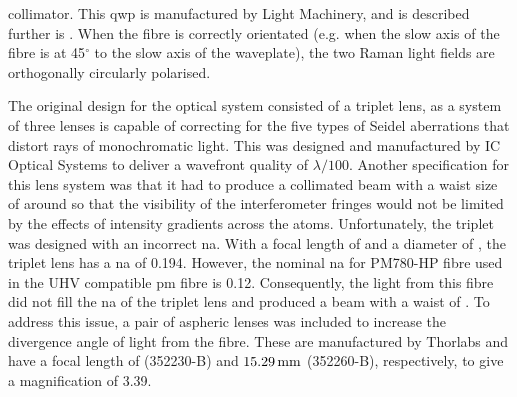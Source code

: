 collimator. This \ac{qwp} is manufactured by Light Machinery, and is described
further is . When the fibre is correctly
orientated (e.g. when the slow axis of the fibre is at 45$^\circ$ to the slow
axis of the waveplate), the two Raman light fields are orthogonally circularly
polarised. \par\noindent The original design for the optical system consisted of
a triplet lens, as a system of three lenses is capable of correcting for the
five types of Seidel aberrations that distort rays of monochromatic light. This
was designed and manufactured by IC Optical Systems to deliver a
wavefront quality of $\lambda/100$. Another specification for
this lens system was that it had to produce a collimated beam with a waist size
of around  so that the visibility of the
interferometer fringes would not be limited by the effects of intensity gradients across the
atoms. Unfortunately, the triplet was designed with an incorrect \ac{na}. With a
focal length of  and a diameter of
, the triplet lens has a \ac{na} of 0.194. However,
the nominal \ac{na} for PM780-HP fibre used in the UHV compatible \ac{pm} fibre
is 0.12. Consequently, the light from this fibre did not fill the \ac{na} of the
triplet lens and produced a beam with a waist of . 
To address this issue, a pair of aspheric lenses was included to increase
the divergence angle of light from the fibre. These are manufactured by Thorlabs
and have a focal length of  (352230-B) and
\(\sivalue{15.29}{\milli\metre}\) (352260-B), respectively, to give a
magnification of 3.39.
